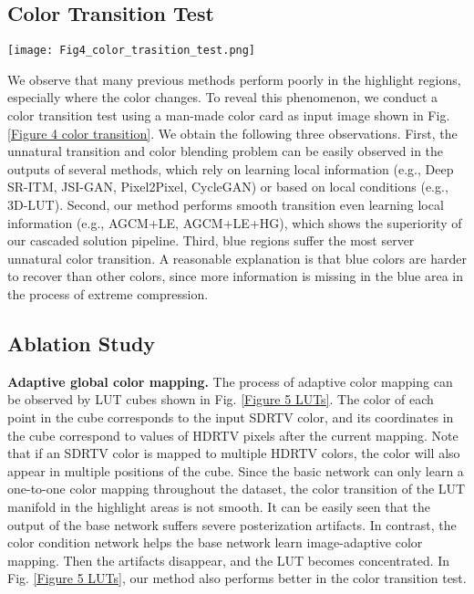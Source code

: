 \documentclass[10pt,twocolumn,letterpaper]{article}
\begin{document}
\subsection{Color Transition Test}
\begin{figure*}[!t]
   \begin{center}
\texttt{[image: Fig4\_color\_trasition\_test.png]}
   \end{center}
      \vspace{-10pt}
      \caption{Color test visualization. The top row describes the categories of algorithms.}
   \label{Figure 4 color transition}
   \end{figure*}
We observe that many previous methods perform poorly in the highlight regions, especially where the color changes. To reveal this phenomenon, we conduct a color transition test using a man-made color card as input image shown in Fig. \ref{Figure 4 color transition}. We obtain the following three observations. First, the unnatural transition and color blending problem can be easily observed in the outputs of several methods, which rely on learning local information (e.g., Deep SR-ITM, JSI-GAN, Pixel2Pixel, CycleGAN) or based on local conditions (e.g., 3D-LUT). Second, our method performs smooth transition even learning local information (e.g., AGCM+LE, AGCM+LE+HG), which shows the superiority of our cascaded solution pipeline. Third, blue regions suffer the most server unnatural color transition. A reasonable explanation is that blue colors are harder to recover than other colors, since more information is missing in the blue area in the process of extreme compression. 

\subsection{Ablation Study}
\textbf{Adaptive global color mapping.} The process of adaptive color mapping can be observed by LUT cubes shown in Fig. \ref{Figure 5 LUTs}. The color of each point in the cube corresponds to the input SDRTV color, and its coordinates in the cube correspond to values of HDRTV pixels after the current mapping. Note that if an SDRTV color is mapped to multiple HDRTV colors, the color will also appear in multiple positions of the cube. Since the basic network can only learn a one-to-one color mapping throughout the dataset, the color transition of the LUT manifold in the highlight areas is not smooth. It can be easily seen that the output of the base network suffers severe posterization artifacts. In contrast, the color condition network helps the base network learn image-adaptive color mapping. Then the artifacts disappear, and the LUT becomes concentrated. In Fig. \ref{Figure 5 LUTs}, our method also performs better in the color transition test.
\end{document}

